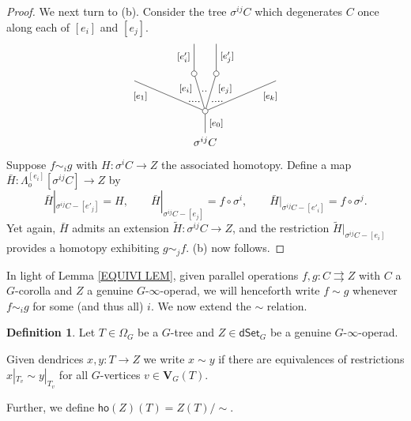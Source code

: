 \documentclass[a4paper,10pt]{article}%
\numberwithin{equation}{section}
\numberwithin{figure}{section}
\theoremstyle{definition} %
\newtheorem{definition}[equation]{Definition}%
\newcommand{\1}{\ensuremath{\mathbbm 1}}%
\begin{document}
\begin{proof}
We next turn to (b). Consider the tree $\sigma^{ij} C$ which degenerates $C$ once along each of $[e_i]$ and $[e_j]$.
\[
\begin{tikzpicture}
[grow=up,auto,level distance=2.75em,
every node/.style = {font=\footnotesize},
dummy/.style={circle,draw,inner sep=0pt,minimum size=1.75mm}]
	\node at (0,0) [font=\normalsize]{$\sigma^{ij} C$}
		child{node [dummy] {}
			child{
			edge from parent node [swap,near end] {$[e_k]$} node [near start,inner sep=1pt,name=Kn] {}}
			child[level distance=3.4em,sibling distance=2em]{node [dummy] {}
				child[level distance=2.7em]{
				edge from parent node [swap] {$[e'_j]$}
}
			edge from parent node [very near end,swap] {$[e_j]$}
node [near start,inner sep=1pt,name=Kone,swap] {}
node [inner sep=1pt,name=Kn2] {}}
			child[level distance=3.4em,sibling distance=2em]{node [dummy] {}
				child[level distance=2.7em]{
				edge from parent node {$[e'_i]$}
}
			edge from parent node [very near end] {$[e_i]$}
node [inner sep=1pt,name=Kone2,swap] {}
node [near start,inner sep=1pt,name=Kone1] {}}
			child{
			edge from parent node [near end] {$[e_1]$}
node [swap] {}
node [near start,inner sep=1pt,name=Kn1,swap]{}}
		edge from parent node [swap] {$[e_0]$}
		};
		\draw [dotted,thick] (Kn) -- (Kone) ;
		\draw [dotted,thick] (Kone1) -- (Kn1) ;
		\draw [dotted,thick] (Kone2) -- (Kn2) ;
\end{tikzpicture}
\]
Suppose $f \sim_i g$ with $H \colon \sigma^{i} C \to Z$ the associated homotopy.
Define a map 
$\bar{H} \colon \Lambda^{[e_i]}_o[\sigma^{ij} C] \to Z$ by
\[
	\bar{H}|_{\sigma^{ij}C - [e'_j]} = H,
		\qquad
	\bar{H}|_{\sigma^{ij}C - [e_j]} = f \circ \sigma^i,
		\qquad
	\bar{H}|_{\sigma^{ij}C - [e'_i]} = f \circ \sigma^j.
\]
Yet again, $\bar{H}$ admits an extension $\widetilde{H} \colon \sigma^{ij}C \to Z$, and the restriction $\widetilde{H}|_{\sigma^{ij}C - [e_i]}$
provides a homotopy exhibiting $g \sim_j f$. (b) now follows.
\end{proof}



In light of Lemma \ref{EQUIVI LEM},
given parallel operations $f,g \colon C \rightrightarrows Z$ with 
$C$ a $G$-corolla and $Z$ a genuine $G$-$\infty$-operad,
we will henceforth write $f \sim g$ whenever $f \sim_i g$ for some (and thus all) $i$.
We now extend the $\sim$ relation.

\begin{definition}\label{XTENDSIM DEF}
	Let $T \in \Omega_G$ be a $G$-tree
	and $Z \in \mathsf{dSet}_G$ be a 
	genuine $G$-$\infty$-operad.
	
	Given dendrices $x,y\colon T \to Z$ we write
	$x \sim y$ if there are equivalences of restrictions
	$x|_{T_v} \sim y|_{T_v}$ for all $G$-vertices
	$v \in \boldsymbol{V}_G(T)$.
	
	Further, we define $\mathsf{ho}(Z)(T) = Z(T)/\sim$.
\end{definition}
\end{document}
